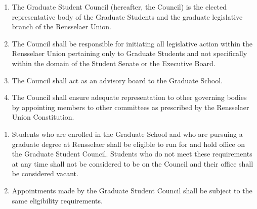 \documentclass{union-doc}
\begin{document}
\MakeUnionDocFrontMatter




\begin{enumerate}
\item The Graduate Student Council (hereafter, the Council) is the elected representative body of the Graduate Students and the graduate legislative branch of the Rensselaer Union.
\item The Council shall be responsible for initiating all legislative action within the Rensselaer Union pertaining only to Graduate Students and not specifically within the domain of the Student Senate or the Executive Board.
\item The Council shall act as an advisory board to the Graduate School.
\item The Council shall ensure adequate representation to other governing bodies by appointing members to other committees as prescribed by the Rensselaer Union Constitution.
\end{enumerate}


\begin{enumerate}
\item Students who are enrolled in the Graduate School and who are pursuing a graduate degree at Rensselaer shall be eligible to run for and hold office on the Graduate Student Council. Students who do not meet these requirements at any time shall not be considered to be on the Council and their office shall be considered vacant.
\item Appointments made by the Graduate Student Council shall be subject to the same eligibility requirements.
\end{enumerate}

\end{document}
